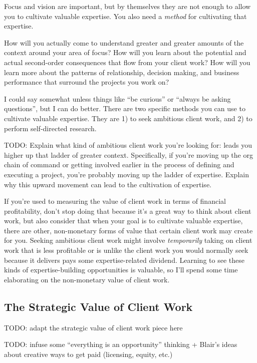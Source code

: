Focus and vision are important, but by themselves they are not enough to allow you to cultivate valuable expertise. You also need a \emph{method} for cultivating that expertise.

How will you actually come to understand greater and greater amounts of the context around your area of focus? How will you learn about the potential and actual second-order consequences that flow from your client work? How will you learn more about the patterns of relationship, decision making, and business performance that surround the projects you work on?

I could say somewhat unless things like ``be curious'' or ``always be asking questions'', but I can do better. There are two specific methods you can use to cultivate valuable expertise. They are 1) to seek ambitious client work, and 2) to perform self-directed research.

TODO: Explain what kind of ambitious client work you're looking for: leads you higher up that ladder of greater context. Specifically, if you're moving up the org chain of command or getting involved earlier in the process of defining and executing a project, you're probably moving up the ladder of expertise. Explain why this upward movement can lead to the cultivation of expertise.

If you're used to measuring the value of client work in terms of financial profitability, don't stop doing that because it's a great way to think about client work, but also consider that when your goal is to cultivate valuable expertise, there are other, non-monetary forms of value that certain client work may create for you. Seeking ambitious client work might involve \emph{temporarily} taking on client work that is less profitable or is unlike the client work you would normally seek because it delivers pays some expertise-related dividend. Learning to see these kinds of expertise-building opportunities is valuable, so I'll spend some time elaborating on the non-monetary value of client work.

\subsection{The Strategic Value of Client Work}

TODO: adapt the strategic value of client work piece here

TODO: infuse some “everything is an opportunity” thinking + Blair’s ideas about creative ways to get paid (licensing, equity, etc.)

